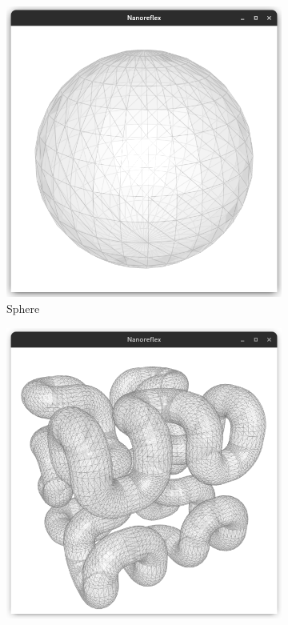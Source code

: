 \documentclass{stdlocal}
\begin{document}
  \begin{figure}[t]
    \centering
    \begin{subfigure}[b]{0.23\linewidth}
      \centering
      \includegraphics[width=\linewidth,trim={25px 20 25 50},clip]{images/polyhedral-surface-sphere.png}
      \caption{Sphere}
    \end{subfigure}
    \hfill
    \begin{subfigure}[b]{0.23\linewidth}
      \centering
      \includegraphics[width=\linewidth,trim={25px 20 25 50},clip]{images/polyhedral-surface-hilbert-cube.png}

\end{subfigure}
\end{figure}
\end{document}
